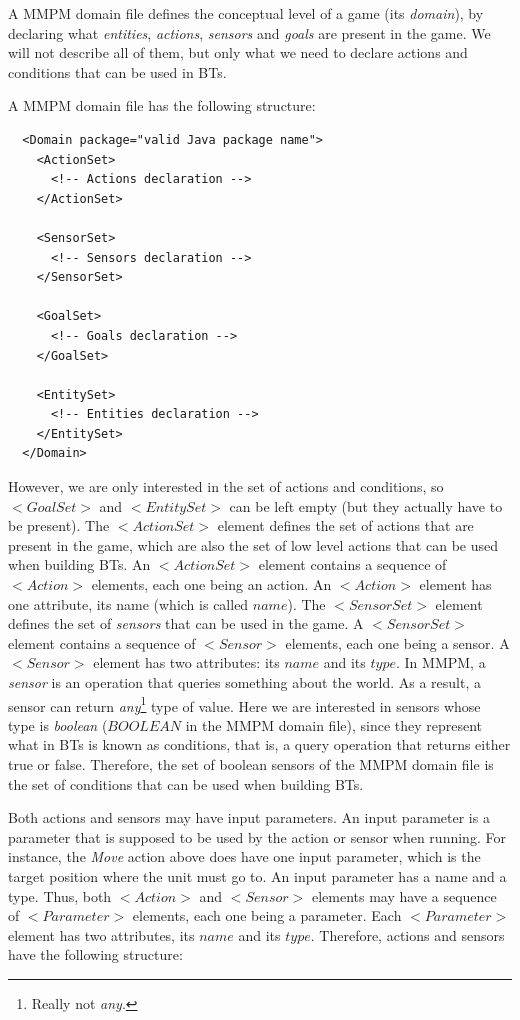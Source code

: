 \documentclass[a4paper]{article}
\begin{document}
A MMPM domain file defines the conceptual level of a game (its \textit{domain}), by declaring what \textit{entities}, \textit{actions}, \textit{sensors} and \textit{goals} are present in the game. We will not describe all of them, but only what we need to declare actions and conditions that can be used in BTs.

A MMPM domain file has the following structure:

\begin{verbatim}
  <Domain package="valid Java package name">
    <ActionSet>
      <!-- Actions declaration -->
    </ActionSet>
    
    <SensorSet>
      <!-- Sensors declaration -->
    </SensorSet>

    <GoalSet>
      <!-- Goals declaration -->
    </GoalSet>

    <EntitySet>
      <!-- Entities declaration -->
    </EntitySet>
  </Domain>
\end{verbatim}

However, we are only interested in the set of actions and conditions, so $<GoalSet>$ and $<EntitySet>$ can be left empty (but they actually have to be present). The $<ActionSet>$ element defines the set of actions that are present in the game, which are also the set of low level actions that can be used when building BTs. An $<ActionSet>$ element contains a sequence of $<Action>$ elements, each one being an action. An $<Action>$ element has one attribute, its name (which is called $name$). The $<SensorSet>$ element defines the set of \textit{sensors} that can be used in the game. A $<SensorSet>$ element contains a sequence of $<Sensor>$ elements, each one being a sensor. A $<Sensor>$ element has two attributes: its $name$ and its $type$. In MMPM, a \textit{sensor} is an operation that queries something about the world. As a result, a sensor can return \textit{any}\footnote{Really not \textit{any}.} type of value. Here we are interested in sensors whose type is \textit{boolean} ($BOOLEAN$ in the MMPM domain file), since they represent what in BTs is known as conditions, that is, a query operation that returns either true or false. Therefore, the set of boolean sensors of the MMPM domain file is the set of conditions that can be used when building BTs. 

Both actions and sensors may have input parameters. An input parameter is a parameter that is supposed to be used by the action or sensor when running. For instance, the \textit{Move} action above does have one input parameter, which is the target position where the unit must go to. An input parameter has a name and a type. Thus, both $<Action>$ and $<Sensor>$ elements may have a sequence of $<Parameter>$ elements, each one being a parameter. Each $<Parameter>$ element has two attributes, its $name$ and its $type$. Therefore, actions and sensors have the following structure:
\end{document}
